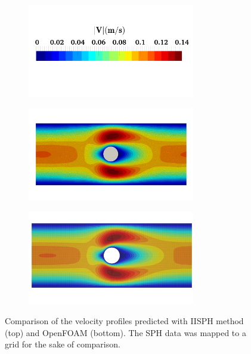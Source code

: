 \begin{figure}[H]
	\centering
	\begin{subfigure}{0.4\columnwidth}	
		\centering
		\includegraphics[width=0.8\textwidth]{images/IISPH/ColorBar.png}
	\end{subfigure}
	
	\begin{subfigure}{0.64\columnwidth}	
		\centering
		\includegraphics[width=0.8\textwidth]{images/IISPH/focSPH.png}
	\end{subfigure}
	
	\begin{subfigure}{0.6\columnwidth}
		\centering
		\includegraphics[width=0.8\textwidth]{images/IISPH/focFV.png}
	\end{subfigure}
	\caption{Comparison of the velocity profiles predicted with IISPH method (top) and OpenFOAM (bottom). The SPH data was mapped to a grid for the sake of comparison.}	\label{fig:FoC_IISPH}
\end{figure} 

